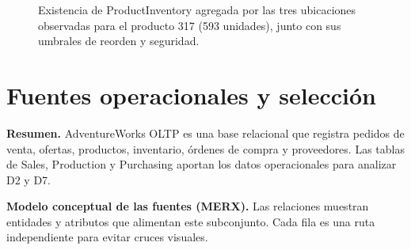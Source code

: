\documentclass[10pt,a4paper]{article}
\begin{document}
\begin{figure}[htbp]
\centering
{}
\caption{Existencia de ProductInventory agregada por las tres ubicaciones
observadas para el producto 317 (593 unidades), junto con sus umbrales de
reorden y seguridad.}
\end{figure}

\section{Fuentes operacionales y selección}

\textbf{Resumen.} AdventureWorks OLTP es una base relacional que registra
pedidos de venta, ofertas, productos, inventario, órdenes de compra y
proveedores. Las tablas de Sales, Production y Purchasing aportan los datos
operacionales para analizar D2 y D7.

\textbf{Modelo conceptual de las fuentes (MERX).} Las relaciones muestran
entidades y atributos que alimentan este subconjunto. Cada fila es una ruta
independiente para evitar cruces visuales.
\end{document}
